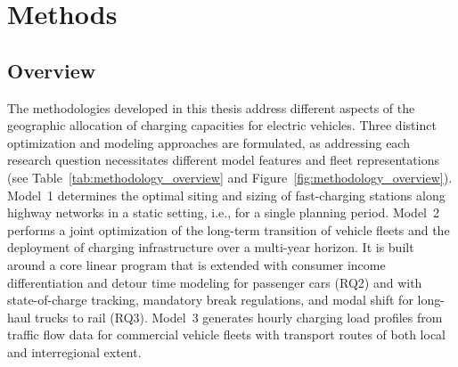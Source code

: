 \chapter{Methods}\label{ch:methods}
    \section{Overview}
        The methodologies developed in this thesis address different aspects of the geographic allocation of charging capacities for electric vehicles. Three distinct optimization and modeling approaches are formulated, as addressing each research question necessitates different model features and fleet representations (see Table~\ref{tab:methodology_overview} and Figure~\ref{fig:methodology_overview}). Model~1 determines the optimal siting and sizing of fast-charging stations along highway networks in a static setting, i.e., for a single planning period. Model~2 performs a joint optimization of the long-term transition of vehicle fleets and the deployment of charging infrastructure over a multi-year horizon. It is built around a core linear program that is extended with consumer income differentiation and detour time modeling for passenger cars (RQ2) and with state-of-charge tracking, mandatory break regulations, and modal shift for long-haul trucks to rail (RQ3). Model~3 generates hourly charging load profiles from traffic flow data for commercial vehicle fleets with transport routes of both local and interregional extent.

